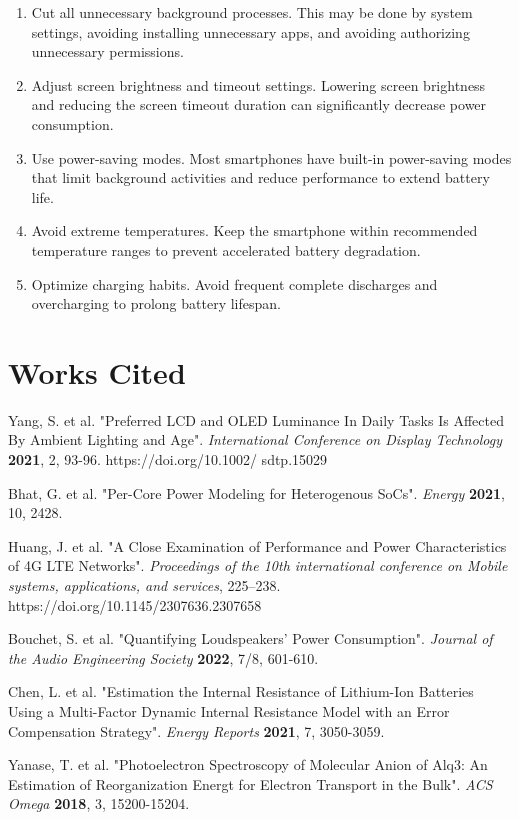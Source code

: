 \documentclass[12pt]{article}
\begin{document}
\begin{enumerate}
	\item Cut all unnecessary background processes. This may be done by system settings, avoiding installing unnecessary apps, and avoiding authorizing unnecessary permissions.
	\item Adjust screen brightness and timeout settings. Lowering screen brightness and reducing the screen timeout duration can significantly decrease power consumption.
	\item Use power-saving modes. Most smartphones have built-in power-saving modes that limit background activities and reduce performance to extend battery life.
	\item Avoid extreme temperatures. Keep the smartphone within recommended temperature ranges to prevent accelerated battery degradation.
	\item Optimize charging habits. Avoid frequent complete discharges and overcharging to prolong battery lifespan.
\end{enumerate}

\section{Works Cited}

\noindent [1] Yang, S. et al. "Preferred LCD and OLED Luminance In Daily Tasks Is Affected By Ambient Lighting and Age". \textit{International Conference on Display Technology} \textbf{2021}, 2, 93-96. https://doi.org/10.1002/ sdtp.15029

\noindent [2][4][10] Bhat, G. et al. "Per-Core Power Modeling for Heterogenous SoCs". \textit{Energy} \textbf{2021}, 10, 2428.

\noindent [3][9] Huang, J. et al. "A Close Examination of Performance and Power Characteristics of 4G LTE Networks". \textit{Proceedings of the 10th international conference on Mobile systems, applications, and services}, 225–238. https://doi.org/10.1145/2307636.2307658

\noindent [5] Bouchet, S. et al. "Quantifying Loudspeakers' Power Consumption". \textit{Journal of the Audio Engineering Society} \textbf{2022}, 7/8, 601-610. 

\noindent [6] Chen, L. et al. "Estimation the Internal Resistance of Lithium-Ion Batteries Using a Multi-Factor Dynamic Internal Resistance Model with an Error Compensation Strategy". \textit{Energy Reports} \textbf{2021}, 7, 3050-3059.

\noindent [7] Yanase, T. et al. "Photoelectron Spectroscopy of Molecular Anion of Alq3: An Estimation of Reorganization Energt for Electron Transport in the Bulk". \textit{ACS Omega} \textbf{2018}, 3, 15200-15204.
\end{document}
